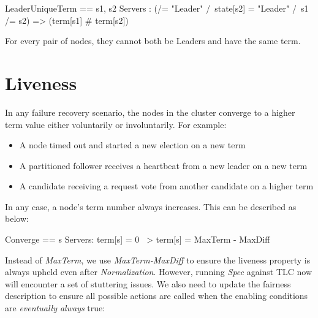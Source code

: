\begin{tla}
LeaderUniqueTerm ==
    \A s1, s2 \in Servers :
        (/\state[s1] = "Leader" 
         /\ state[s2] = "Leader" 
         /\ s1 /= s2)   
            => (term[s1] # term[s2])
\end{tla}
\begin{tlatex}
%
%
%
%
%
%
\end{tlatex}
\newline

For every pair of nodes, they cannot both be Leaders and have the same
term.

\section{Liveness}

In any failure recovery scenario, the nodes in the cluster converge to a higher
term value either voluntarily or involuntarily. For example: 
\begin{itemize}
    \item A node timed out and started a new election on a new term 
    \item A partitioned follower receives a heartbeat from a new leader on a new term
    \item A candidate receiving a request vote from another candidate on a higher term
\end{itemize}

In any case, a node's term number always increases. This can be described as below:\newline
\begin{tla}
Converge ==
    \A s \in Servers:
        term[s] = 0 ~> term[s] = MaxTerm - MaxDiff
\end{tla}
\begin{tlatex}
%
%
\end{tlatex}
\newline

Instead of \textit{MaxTerm}, we use \textit{MaxTerm-MaxDiff} to ensure the
liveness property is always upheld even after \textit{Normalization}. However,
running  \textit{Spec} against TLC now will encounter a set of stuttering issues. We
also need to update the fairness description to ensure all possible actions are
called when the enabling conditions are \textit{eventually always} true:\newline

